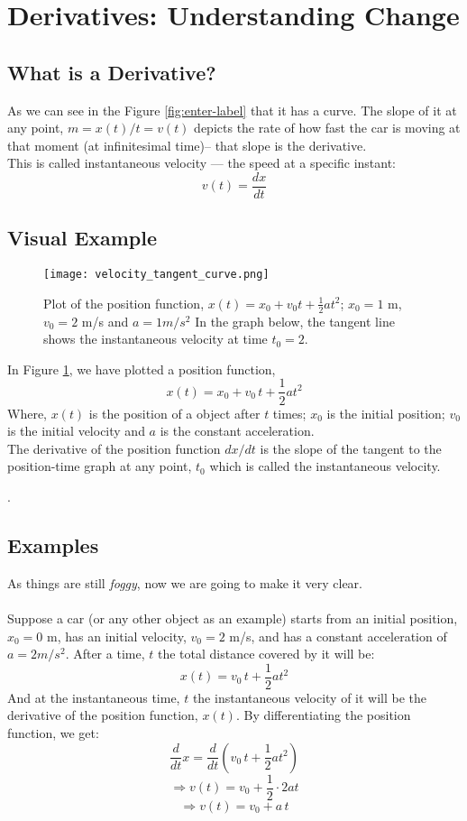 \documentclass[12pt,a4paper]{article}
\begin{document}
\newpage

\section*{Derivatives: Understanding Change}



\subsection*{What is a Derivative?}
As we can see in the Figure \ref{fig:enter-label} that it has a curve. The slope of it at any point, $m= x(t)/t =v(t)$ depicts the rate of how fast the car is moving at that moment (at infinitesimal time)-- that slope is the derivative.\\
This is called instantaneous velocity — the speed at a specific instant:
\[
v(t) = \frac{dx}{dt}
\]


\subsection*{Visual Example}
\begin{figure}
    \centering
    \texttt{[image: velocity\_tangent\_curve.png]}
    \caption{Plot of the position function, $x(t) =x_0 +v_0t+ \frac{1}{2} at^2$; $x_0=1$ m, $v_0 = 2$ m/s and $a=1 m/s^2$ In the graph below, the tangent line shows the instantaneous velocity at time $t_0=2$.}
    \label{fig:niga}
\end{figure}
In Figure \ref{fig:niga}, we have plotted a position function, 
\[
x(t) =x_0 +v_0\,t+ \frac{1}{2} at^2
\] 
Where, $x(t)$ is the position of a object after $t$ times; $x_0$ is the initial position; $v_0$ is the initial velocity and $a$ is the constant acceleration.\\
The derivative of the position function $dx/dt$ is the slope of the tangent to the position-time graph at any point, $t_0$ which is called the instantaneous velocity.

.
\subsection*{Examples}
As things are still \textit{foggy}, now we are going to make it very clear.\\\\
    Suppose a car (or any other object as an example) starts from an initial position, $x_0=0 $ m, has an initial velocity, $v_0=2$ m/s, and has a constant acceleration of $a=2 m/s^2$. After a time, $t$ the total distance covered by it will be:
    \[x(t) = v_0\,t + \frac{1}2{at^2}\]
    And at the instantaneous time, $t$  the instantaneous velocity of it will be the derivative of the position function, $x(t)$.
    By differentiating the position function, we get:
    \[ \frac{d}{dt}x = \frac{d}{dt}(v_0\, t+\frac{1}{2}at^2)\]
    \[\Rightarrow  v (t) = v_0 + \frac{1}{2}\cdot2 at\]
    \[\Rightarrow v(t) = v_0 +a\,t\]
\end{document}
